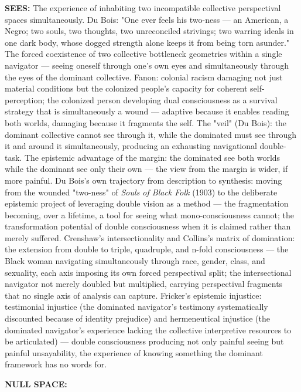 \textbf{SEES:} The experience of inhabiting two incompatible collective perspectival spaces simultaneously. Du Bois: "One ever feels his two-ness — an American, a Negro; two souls, two thoughts, two unreconciled strivings; two warring ideals in one dark body, whose dogged strength alone keeps it from being torn asunder." The forced coexistence of two collective bottleneck geometries within a single navigator — seeing oneself through one's own eyes and simultaneously through the eyes of the dominant collective. Fanon: colonial racism damaging not just material conditions but the colonized people's capacity for coherent self-perception; the colonized person developing dual consciousness as a survival strategy that is simultaneously a wound — adaptive because it enables reading both worlds, damaging because it fragments the self. The "veil" (Du Bois): the dominant collective cannot see through it, while the dominated must see through it and around it simultaneously, producing an exhausting navigational double-task. The epistemic advantage of the margin: the dominated see both worlds while the dominant see only their own — the view from the margin is wider, if more painful. Du Bois's own trajectory from description to synthesis: moving from the wounded "two-ness" of \textit{Souls of Black Folk} (1903) to the deliberate epistemic project of leveraging double vision as a method — the fragmentation becoming, over a lifetime, a tool for seeing what mono-consciousness cannot; the transformation potential of double consciousness when it is claimed rather than merely suffered. Crenshaw's intersectionality and Collins's matrix of domination: the extension from double to triple, quadruple, and n-fold consciousness — the Black woman navigating simultaneously through race, gender, class, and sexuality, each axis imposing its own forced perspectival split; the intersectional navigator not merely doubled but multiplied, carrying perspectival fragments that no single axis of analysis can capture. Fricker's epistemic injustice: testimonial injustice (the dominated navigator's testimony systematically discounted because of identity prejudice) and hermeneutical injustice (the dominated navigator's experience lacking the collective interpretive resources to be articulated) — double consciousness producing not only painful seeing but painful unsayability, the experience of knowing something the dominant framework has no words for.


\textbf{NULL SPACE:}

